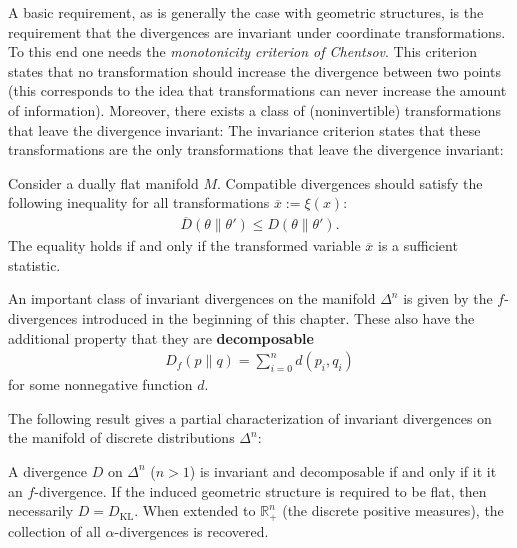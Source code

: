     A basic requirement, as is generally the case with geometric structures, is the requirement that the divergences are invariant under coordinate transformations. To this end one needs the \textit{monotonicity criterion of Chentsov}. This criterion states that no transformation should increase the divergence between two points (this corresponds to the idea that transformations can never increase the amount of information). Moreover, there exists a class of (noninvertible) transformations that leave the divergence invariant:
    The invariance criterion states that these transformations are the only transformations that leave the divergence invariant:
    \begin{axiom}
        Consider a dually flat manifold $M$. Compatible divergences should satisfy the following inequality for all transformations $\overline{x}:=\xi(x)$:
        \begin{gather}
            \overline{D}(\theta\|\theta')\leq D(\theta\|\theta').
        \end{gather}
        The equality holds if and only if the transformed variable $\overline{x}$ is a sufficient statistic.
    \end{axiom}

    \begin{example}[$f$-divergences]
        An important class of invariant divergences on the manifold $\Delta^n$ is given by the $f$-divergences introduced in the beginning of this chapter. These also have the additional property that they are \textbf{decomposable}
        \begin{gather}
            D_f(p\|q) = \sum_{i=0}^n d(p_i, q_i)
        \end{gather}
        for some nonnegative function $d$.
    \end{example}
    The following result gives a partial characterization of invariant divergences on the manifold of discrete distributions $\Delta^n$:
    \begin{property}
        A divergence $D$ on $\Delta^n$ ($n>1$) is invariant and decomposable if and only if it it an $f$-divergence. If the induced geometric structure is required to be flat, then necessarily $D = D_\mathrm{KL}$. When extended to $\mathbb{R}^n_+$ (the discrete positive measures), the collection of all $\alpha$-divergences is recovered.
    \end{property}

